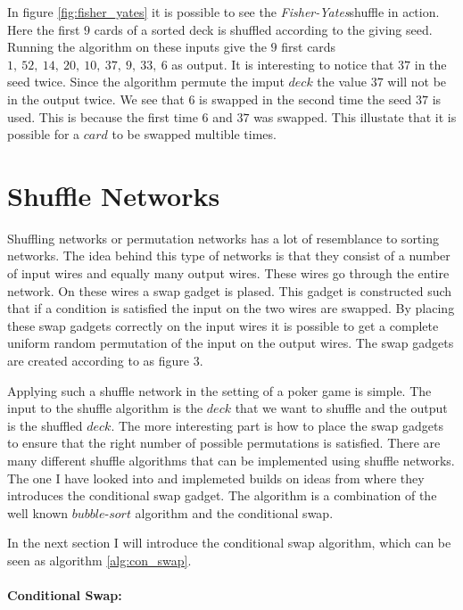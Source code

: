 \documentclass[twoside,11pt,openright]{report}
\newcommand{\FY}{\textit{Fisher-Yates}}
\begin{document}
In figure \ref{fig:fisher_yates} it is possible to see the \FY shuffle in action. Here the first $9$ cards of a sorted deck is shuffled according to the giving seed. Running the algorithm on these inputs give the $9$ first cards $1,~52,~14,~20,~10,~37,~9,~33,~6$ as output. It is interesting to notice that $37$ in the seed twice. Since the algorithm permute the imput $deck$ the value $37$ will not be in the output twice. We see that $6$ is swapped in the second time the seed $37$ is used. This is because the first time $6$ and $37$ was swapped. This illustate that it is possible for a $card$ to be swapped multible times.


\section{Shuffle Networks}
Shuffling networks or permutation networks has a lot of resemblance to sorting networks. The idea behind this type of networks is that they consist of a number of input wires and equally many output wires. These wires go through the entire network. On these wires a swap gadget is plased. This gadget is constructed such that if a condition is satisfied the input on the two wires are swapped. By placing these swap gadgets correctly on the input wires it is possible to get a complete uniform random permutation of the input on the output wires. The swap gadgets are created according to  as figure 3.

Applying such a shuffle network in the setting of a poker game is simple. The input to the shuffle algorithm is the $deck$ that we want to shuffle and the output is the shuffled $deck$. The more interesting part is how to place the swap gadgets to ensure that the right number of possible permutations is satisfied. There are many different shuffle algorithms that can be implemented using shuffle networks. The one I have looked into and implemeted builds on ideas from  where they introduces the conditional swap gadget. The algorithm is a combination of the well known $bubble\text{-}sort$ algorithm and the conditional swap.

\bigskip

In the next section I will introduce the conditional swap algorithm, which can be seen as algorithm \ref{alg:con_swap}.

\bigskip

\paragraph{Conditional Swap:}
\label{sec:con_swap}
\end{document}
